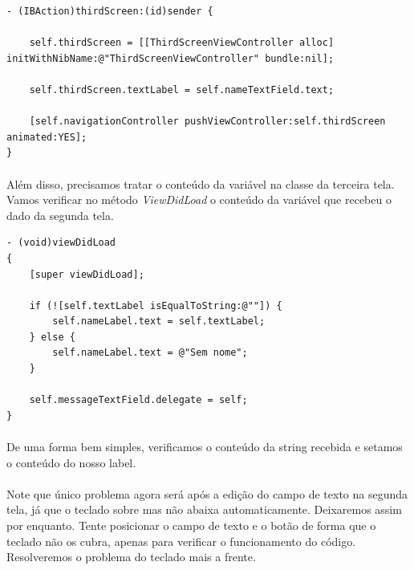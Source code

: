 \documentclass[a4paper,12pt,brazil,doubleside]{book}
\begin{document}
\begin{lstlisting}
- (IBAction)thirdScreen:(id)sender {
    
    self.thirdScreen = [[ThirdScreenViewController alloc] initWithNibName:@"ThirdScreenViewController" bundle:nil];
    
    self.thirdScreen.textLabel = self.nameTextField.text;
    
    [self.navigationController pushViewController:self.thirdScreen animated:YES];
}
\end{lstlisting}

\bigskip
\bigskip

\paragraph{}Além disso, precisamos tratar o conteúdo da variável na classe da terceira tela. Vamos verificar no método \emph{ViewDidLoad} o conteúdo da variável que recebeu o dado da segunda tela.\\

\begin{lstlisting}
- (void)viewDidLoad
{
    [super viewDidLoad];
    
    if (![self.textLabel isEqualToString:@""]) {
        self.nameLabel.text = self.textLabel;
    } else {
        self.nameLabel.text = @"Sem nome";
    }
    
    self.messageTextField.delegate = self;
}
\end{lstlisting}

\bigskip
\bigskip

\paragraph{}De uma forma bem simples, verificamos o conteúdo da string recebida e setamos o conteúdo do nosso label.
\paragraph{}Note que único problema agora será após a edição do campo de texto na segunda tela, já que o teclado sobre mas não abaixa automaticamente. Deixaremos assim por enquanto. Tente posicionar o campo de texto e o botão de forma que o teclado não os cubra, apenas para verificar o funcionamento do código. Resolveremos o problema do teclado mais a frente.\\

\bigskip
\bigskip
\bigskip
\bigskip
\end{document}
